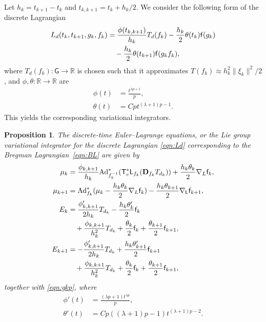 \documentclass[letterpaper, 10pt, conference]{ieeeconf}
\newcommand{\G}{\ensuremath{\mathsf{G}}}
\newcommand{\T}{\ensuremath{\mathsf{T}}}
\renewcommand{\L}{\ensuremath{\mathsf{L}}}
\renewcommand{\Re}{\ensuremath{\mathbb{R}}}
\newcommand{\D}{\ensuremath{\mathbf{D}}}
\newcommand{\Ad}{\ensuremath{\mathrm{Ad}}}
\newtheorem{prop}{Proposition}
\begin{document}
Let $h_k = t_{k+1}- t_k$ and $t_{k,k+1} = t_k + h_k/2$.  
We consider the following form of the discrete Lagrangian
\begin{align}
    L_d(t_k, t_{k+1}, g_k, f_k ) & = \frac{\phi(t_{k,k+1}) }{h_k} T_d(f_k) -\frac{h_k}{2} \theta(t_k) \mathsf{f} (g_k)\nonumber \\
                                 & \quad -\frac{h_k}{2} \theta(t_{k+1}) \mathsf{f} (g_kf_k), \label{eqn:Ld}
\end{align}
where $T_d(f_k):\G\rightarrow\Re$ is chosen such that it approximates $T(f_k) \approx h_k^2 \|\xi_k \|^2/2$, and $\phi,\theta:\Re\rightarrow\Re$ are 
\begin{align}
    \phi(t) & = \frac{t^{\lambda p +1}}{p},\\
    \theta(t) & = C p t^{(\lambda+1)p-1}.
\end{align}
This yields the corresponding variational integrators. 
\begin{prop}\label{prop:DEL_Breg}
    The discrete-time Euler--Lagrange equations, or the Lie group variational integrator for the discrete Lagrangian \eqref{eqn:Ld} corresponding to the Bregman Lagrangian~\eqref{eqn:BL} are given by
\begin{align}
    \mu_k & =  \frac{\phi_{k,k+1}}{h_k}\Ad^*_{f_k^{-1}} (\T^*_e\L_{f_k}(\D_{f_k} T_{d_k})) + \frac{h_k\theta_k}{2} \nabla_L \obj_k, \label{eqn:muk_Breg}\\
    \mu_{k+1} & = \Ad^*_{f_k}( \mu_k - \frac{h_k\theta_k}{2} \nabla_L\obj_k ) -\frac{h_k\theta_{k+1}}{2} \nabla_\L \obj_{k+1}, \label{eqn:mukp_Breg}\\
    E_{k} & = \frac{\phi'_{k,k+1}}{ 2 h_k} T_{d_k} -\frac{h_k\theta'_{k}}{2} \obj_{k} \nonumber\\\
          & \quad + \frac{\phi_{k,k+1}}{h_k^2}T_{d_k} + \frac{\theta_k}{2}\obj_k + \frac{\theta_{k+1}}{2}\obj_{k+1}, \label{eqn:Ek_Breg}\\
    E_{k+1} & = -\frac{\phi'_{k,k+1}}{ 2 h_k} T_{d_k} +\frac{h_k\theta'_{k+1}}{2} \obj_{k+1}\nonumber \\\
            & \quad + \frac{\phi_{k,k+1}}{h_k^2}T_{d_k} +\frac{\theta_k}{2}\obj_k + \frac{\theta_{k+1}}{2}\obj_{k+1}, \label{eqn:Ekp_Breg}
\end{align}
together with \eqref{eqn:gkp}, where
\begin{align*}
    \phi'(t) & = \frac{(\lambda p +1) t^{\lambda p}}{p}, \\
    \theta'(t) &  = Cp((\lambda+1)p-1) t^{(\lambda +1)p-2}.
\end{align*}
\end{prop}
\end{document}
